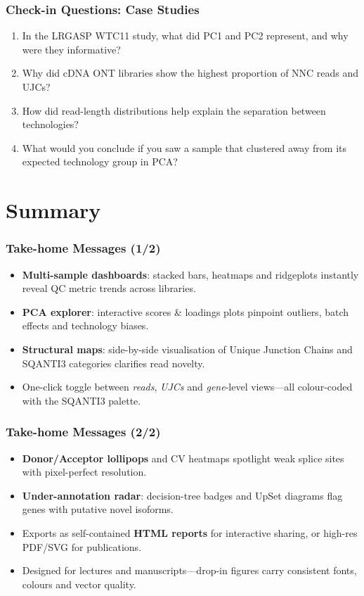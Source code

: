 \documentclass[aspectratio=169]{beamer}
\begin{document}
\begin{frame}
  \frametitle{Check-in Questions: Case Studies}
  \begin{enumerate}
    \item In the LRGASP WTC11 study, what did PC1 and PC2 represent, and why were they informative?
    \vspace{0.5cm}
    \item Why did cDNA ONT libraries show the highest proportion of NNC reads and UJCs?
    \vspace{0.5cm}
    \item How did read-length distributions help explain the separation between technologies?
    \vspace{0.5cm}
    \item What would you conclude if you saw a sample that clustered away from its expected technology group in PCA?
  \end{enumerate}
\end{frame}

\section{Summary}

\begin{frame}
  \frametitle{Take-home Messages \textnormal{(1/2)}}
  \begin{itemize}
    \item \textbf{Multi-sample dashboards}: stacked bars, heatmaps and ridgeplots instantly reveal QC metric trends across libraries.
    \item \textbf{PCA explorer}: interactive scores \& loadings plots pinpoint outliers, batch effects and technology biases.
    \item \textbf{Structural maps}: side-by-side visualisation of Unique Junction Chains and SQANTI3 categories clarifies read novelty.
    \item One-click toggle between \emph{reads}, \emph{UJCs} and \emph{gene}-level views—all colour-coded with the SQANTI3 palette.
  \end{itemize}
\end{frame}

\begin{frame}
  \frametitle{Take-home Messages \textnormal{(2/2)}}
  \begin{itemize}
    \item \textbf{Donor/Acceptor lollipops} and CV heatmaps spotlight weak splice sites with pixel-perfect resolution.
    \item \textbf{Under-annotation radar}: decision-tree badges and UpSet diagrams flag genes with putative novel isoforms.
    \item Exports as self-contained \textbf{HTML reports} for interactive sharing, or high-res PDF/SVG for publications.
    \item Designed for lectures and manuscripts—drop-in figures carry consistent fonts, colours and vector quality.
  \end{itemize}
\end{frame}
\end{document}
